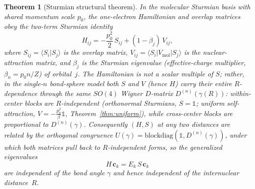 \documentclass[aps,pra,twocolumn,superscriptaddress,longbibliography]{revtex4-2}
\newtheorem{theorem}{Theorem}
\theoremstyle{remark}
\theoremstyle{plain}
\begin{document}
\begin{theorem}[Sturmian structural theorem]
\label{thm:structural}
In the molecular Sturmian basis with shared momentum scale $p_0$,
the one-electron Hamiltonian and overlap matrices obey the two-term
Sturmian identity
\begin{equation}
H_{ij} = -\frac{p_0^2}{2}\,S_{ij} + (1-\beta_j)\,V_{ij},
\label{eq:H_prop_S}
\end{equation}
where $S_{ij}=\langle S_i|S_j\rangle$ is the overlap matrix,
$V_{ij}=\langle S_i|V_{\mathrm{mol}}|S_j\rangle$ is the nuclear-attraction
matrix, and $\beta_j$ is the Sturmian eigenvalue (effective-charge
multiplier, $\beta_n = p_0 n/Z$) of orbital~$j$.  The Hamiltonian is
\emph{not} a scalar multiple of $S$; rather, in the single-$n$ bond-sphere
model both $S$ and $V$ (hence $H$) carry their \emph{entire}
$R$-dependence through the same $SO(4)$ Wigner $D$-matrix
$D^{(n)}(\gamma(R))$: within-center blocks are $R$-independent
(orthonormal Sturmians, $S=\mathbb{1}$; uniform self-attraction,
$V=-\tfrac{p_0^2}{\beta}\mathbb{1}$, Theorem~\ref{thm:uniform}), while
cross-center blocks are proportional to $D^{(n)}(\gamma)$.  Consequently
$(H,S)$ at any two distances are related by the orthogonal congruence
$U(\gamma)=\mathrm{blockdiag}(\mathbb{1},D^{(n)}(\gamma))$, under which both
matrices pull back to $R$-independent forms, so the generalized eigenvalues
\begin{equation}
H\,\mathbf{c}_k = E_k\, S\,\mathbf{c}_k
\label{eq:E_geom_indep}
\end{equation}
are independent of the bond angle $\gamma$ and hence independent of the
internuclear distance~$R$.
\end{theorem}
\end{document}
